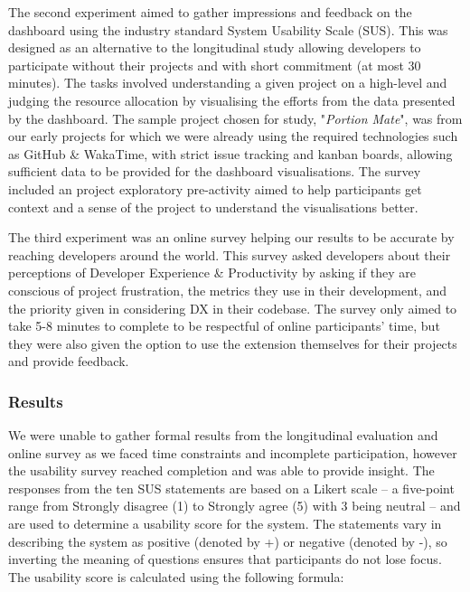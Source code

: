 \documentclass[../mpaper.tex]{subfiles}
\begin{document}
The second experiment aimed to gather impressions and feedback on the dashboard using the industry standard System Usability Scale (SUS). This was designed as an alternative to the longitudinal study allowing developers to participate without their projects and with short commitment (at most 30 minutes). The tasks involved understanding a given project on a high-level and judging the resource allocation by visualising the efforts from the data presented by the dashboard. The sample project chosen for study, "\textit{Portion Mate}", was from our early projects for which we were already using the required technologies such as GitHub \& WakaTime, with strict issue tracking and kanban boards, allowing sufficient data to be provided for the dashboard visualisations. The survey included an project exploratory pre-activity aimed to help participants get context and a sense of the project to understand the visualisations better. %

The third experiment was an online survey helping our results to be accurate by reaching developers around the world. This survey asked developers about their perceptions of Developer Experience \& Productivity by asking if they are conscious of project frustration, the metrics they use in their development, and the priority given in considering DX in their codebase. The survey only aimed to take 5-8 minutes to complete to be respectful of online participants' time, but they were also given the option to use the extension themselves for their projects and provide feedback.

\subsubsection*{Results}

We were unable to gather formal results from the longitudinal evaluation and online survey as we faced time constraints and incomplete participation, however the usability survey reached completion and was able to provide insight. The responses from the ten SUS statements are based on a Likert scale -- a five-point range from Strongly disagree (1) to Strongly agree (5) with 3 being neutral -- and are used to determine a usability score for the system. The statements vary in describing the system as positive (denoted by +) or negative (denoted by -), so inverting the meaning of questions ensures that participants do not lose focus. The usability score is calculated using the following formula:
\end{document}
